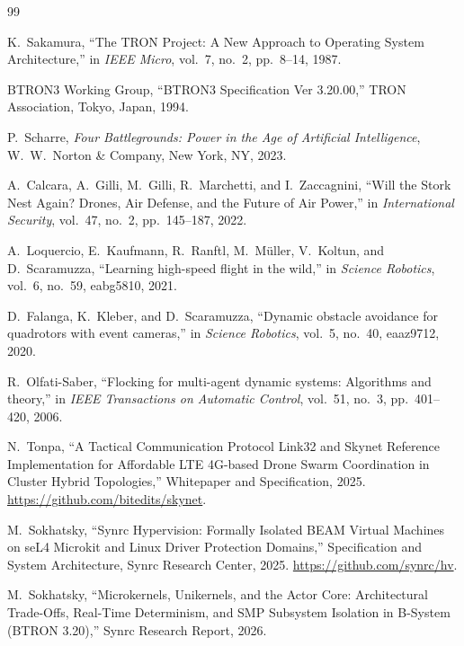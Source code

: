 \documentclass[10pt,journal,compsoc,twocolumn]{article}
\begin{document}
\begin{thebibliography}{99}

K.~Sakamura, ``The TRON Project: A New Approach to Operating System Architecture,'' in \emph{IEEE Micro}, vol.~7, no.~2, pp.~8--14, 1987.

BTRON3 Working Group, ``BTRON3 Specification Ver 3.20.00,'' TRON Association, Tokyo, Japan, 1994.

P.~Scharre, \emph{Four Battlegrounds: Power in the Age of Artificial Intelligence}, W.~W.~Norton \& Company, New York, NY, 2023.

A.~Calcara, A.~Gilli, M.~Gilli, R.~Marchetti, and I.~Zaccagnini, ``Will the Stork Nest Again? Drones, Air Defense, and the Future of Air Power,'' in \emph{International Security}, vol.~47, no.~2, pp.~145--187, 2022.

A.~Loquercio, E.~Kaufmann, R.~Ranftl, M.~M{\"u}ller, V.~Koltun, and D.~Scaramuzza, ``Learning high-speed flight in the wild,'' in \emph{Science Robotics}, vol.~6, no.~59, eabg5810, 2021.

D.~Falanga, K.~Kleber, and D.~Scaramuzza, ``Dynamic obstacle avoidance for quadrotors with event cameras,'' in \emph{Science Robotics}, vol.~5, no.~40, eaaz9712, 2020.

R.~Olfati-Saber, ``Flocking for multi-agent dynamic systems: Algorithms and theory,'' in \emph{IEEE Transactions on Automatic Control}, vol.~51, no.~3, pp.~401--420, 2006.

N.~Tonpa, ``A Tactical Communication Protocol Link32 and Skynet Reference Implementation for Affordable LTE 4G-based Drone Swarm Coordination in Cluster Hybrid Topologies,'' Whitepaper and Specification, 2025. \url{https://github.com/bitedits/skynet}.

M.~Sokhatsky, ``Synrc Hypervision: Formally Isolated BEAM Virtual Machines on seL4 Microkit and Linux Driver Protection Domains,'' Specification and System Architecture, Synrc Research Center, 2025. \url{https://github.com/synrc/hv}.

M.~Sokhatsky, ``Microkernels, Unikernels, and the Actor Core: Architectural Trade-Offs, Real-Time Determinism, and SMP Subsystem Isolation in B-System (BTRON 3.20),'' Synrc Research Report, 2026.


\end{thebibliography}
\end{document}
